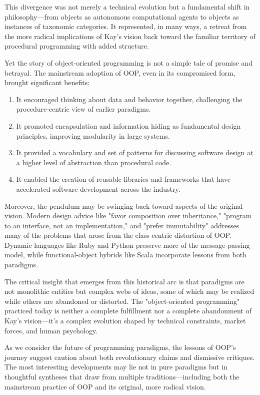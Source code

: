 \documentclass[11pt]{article}
\begin{document}
This divergence was not merely a technical evolution but a fundamental shift in philosophy—from objects as autonomous computational agents to objects as instances of taxonomic categories. It represented, in many ways, a retreat from the more radical implications of Kay's vision back toward the familiar territory of procedural programming with added structure.

Yet the story of object-oriented programming is not a simple tale of promise and betrayal. The mainstream adoption of OOP, even in its compromised form, brought significant benefits:

\begin{enumerate}
\item It encouraged thinking about data and behavior together, challenging the procedure-centric view of earlier paradigms.

\item It promoted encapsulation and information hiding as fundamental design principles, improving modularity in large systems.

\item It provided a vocabulary and set of patterns for discussing software design at a higher level of abstraction than procedural code.

\item It enabled the creation of reusable libraries and frameworks that have accelerated software development across the industry.
\end{enumerate}

Moreover, the pendulum may be swinging back toward aspects of the original vision. Modern design advice like "favor composition over inheritance," "program to an interface, not an implementation," and "prefer immutability" addresses many of the problems that arose from the class-centric distortion of OOP. Dynamic languages like Ruby and Python preserve more of the message-passing model, while functional-object hybrids like Scala incorporate lessons from both paradigms.

The critical insight that emerges from this historical arc is that paradigms are not monolithic entities but complex webs of ideas, some of which may be realized while others are abandoned or distorted. The "object-oriented programming" practiced today is neither a complete fulfillment nor a complete abandonment of Kay's vision—it's a complex evolution shaped by technical constraints, market forces, and human psychology.

As we consider the future of programming paradigms, the lessons of OOP's journey suggest caution about both revolutionary claims and dismissive critiques. The most interesting developments may lie not in pure paradigms but in thoughtful syntheses that draw from multiple traditions—including both the mainstream practice of OOP and its original, more radical vision.
\end{document}
